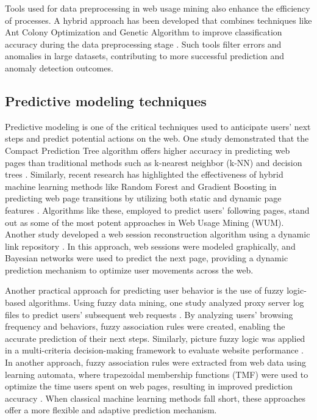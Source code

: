 Tools used for data preprocessing in web usage mining also enhance the efficiency of processes. A hybrid approach has been developed that combines techniques like Ant Colony Optimization and Genetic Algorithm to improve classification accuracy during the data preprocessing stage \cite{Malik2021b}. Such tools filter errors and anomalies in large datasets, contributing to more successful prediction and anomaly detection outcomes.


\subsection{ Predictive modeling techniques}


Predictive modeling is one of the critical techniques used to anticipate users' next steps and predict potential actions on the web. One study demonstrated that the Compact Prediction Tree algorithm offers higher accuracy in predicting web pages than traditional methods such as k-nearest neighbor (k-NN) and decision trees \cite{Mani2020}. Similarly, recent research has highlighted the effectiveness of hybrid machine learning methods like Random Forest and Gradient Boosting in predicting web page transitions by utilizing both static and dynamic page features \cite{Dang2023}. Algorithms like these, employed to predict users' following pages, stand out as some of the most potent approaches in Web Usage Mining (WUM). Another study developed a web session reconstruction algorithm using a dynamic link repository \cite{Jors2023}. In this approach, web sessions were modeled graphically, and Bayesian networks were used to predict the next page, providing a dynamic prediction mechanism to optimize user movements across the web.

Another practical approach for predicting user behavior is the use of fuzzy logic-based algorithms. Using fuzzy data mining, one study analyzed proxy server log files to predict users' subsequent web requests \cite{Gangadwala2023}. By analyzing users' browsing frequency and behaviors, fuzzy association rules were created, enabling the accurate prediction of their next steps. Similarly, picture fuzzy logic was applied in a multi-criteria decision-making framework to evaluate website performance \cite{Karahan2024}. In another approach, fuzzy association rules were extracted from web data using learning automata, where trapezoidal membership functions (TMF) were used to optimize the time users spent on web pages, resulting in improved prediction accuracy \cite{Anari2021}. When classical machine learning methods fall short, these approaches offer a more flexible and adaptive prediction mechanism.

